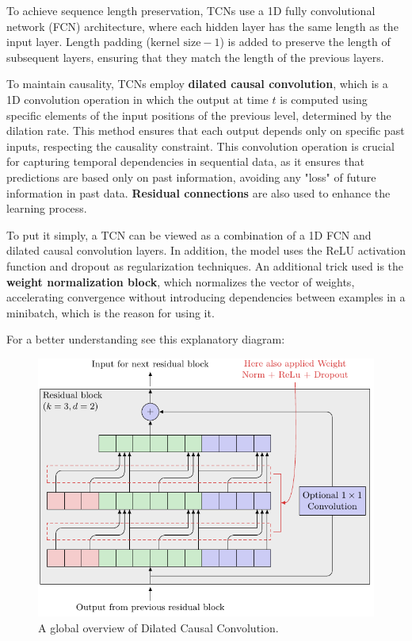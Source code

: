 To achieve sequence length preservation, TCNs use a 1D fully convolutional network (FCN) architecture, where each hidden layer has the same length as the input layer. Length padding ($\text{kernel size} - 1$) is added to preserve the length of subsequent layers, ensuring that they match the length of the previous layers.

To maintain causality, TCNs employ \textbf{dilated causal convolution}, which is a 1D convolution operation in which the output at time $t$ is computed using specific elements of the input positions of the previous level, determined by the dilation rate. This method ensures that each output depends only on specific past inputs, respecting the causality constraint. This convolution operation is crucial for capturing temporal dependencies in sequential data, as it ensures that predictions are based only on past information, avoiding any "loss" of future information in past data. \textbf{Residual connections} are also used to enhance the learning process.

To put it simply, a TCN can be viewed as a combination of a 1D FCN and dilated causal convolution layers. In addition, the model uses the ReLU activation function and dropout as regularization techniques. An additional trick used is the \textbf{weight normalization block}, which normalizes the vector of weights, accelerating convergence without introducing dependencies between examples in a minibatch, which is the reason for using it.

For a better understanding see this explanatory diagram:

\begin{figure}[!htbp]
    \centering
    \includegraphics[width=\linewidth]{tikz/chapter8 - Temporal Convolutional Network.pdf}
    \caption{A global overview of Dilated Causal Convolution.}
\end{figure}

